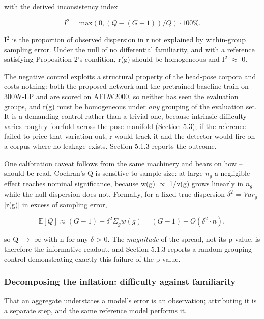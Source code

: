 with the derived inconsistency index 

\begin{equation}
\label{eq:54}
I^{2} = \mathrm{max}( 0 , ( Q - (G - 1) ) / Q ) \cdot 100 \%.
\end{equation}

I$^{2}$ is the proportion of observed dispersion in r not explained by within-group sampling error. Under the null of no differential familiarity, and with a reference satisfying Proposition 2's condition, r(g) should be homogeneous and I$^{2}$ $\approx$ 0.

The negative control exploits a structural property of the head-pose corpora and costs nothing: both the proposed network and the pretrained baseline train on 300W-LP and are scored on AFLW2000, so neither has seen the evaluation groups, and r(g) must be homogeneous under \emph{any} grouping of the evaluation set. It is a demanding control rather than a trivial one, because intrinsic difficulty varies roughly fourfold across the pose manifold (Section 5.3); if the reference failed to price that variation out, r would track it and the detector would fire on a corpus where no leakage exists. Section 5.1.3 reports the outcome.

One calibration caveat follows from the same machinery and bears on how -- should be read. Cochran's Q is sensitive to sample size: at large $n_{g}$ a negligible effect reaches nominal significance, because w(g) $\propto$ 1/v(g) grows linearly in $n_{g}$ while the null dispersion does not. Formally, for a fixed true dispersion $\delta^{2}$ = $Var_{g}$[r(g)] in excess of sampling error,

\begin{equation}
\label{eq:55}
\mathbb{E}[Q] \approx (G - 1) + \delta ^{2} \Sigma _g w(g) = (G - 1) + O( \delta ^{2} \cdot n ),
\end{equation}

so Q $\to$ $\infty$ with n for any $\delta$ > 0. The \emph{magnitude} of the spread, not its p-value, is therefore the informative readout, and Section 5.1.3 reports a random-grouping control demonstrating exactly this failure of the p-value.

\subsubsection{Decomposing the inflation: difficulty against familiarity}

That an aggregate understates a model's error is an observation; attributing it is a separate step, and the same reference model performs it.

